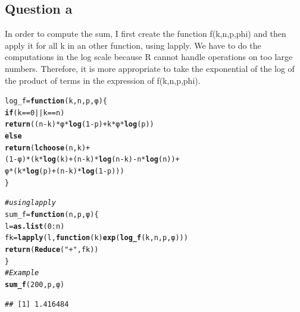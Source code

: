 \documentclass{llncs}\usepackage[]{graphicx}\usepackage[]{color}
\makeatletter
\newcommand{\hlnum}[1]{\textcolor[rgb]{0.686,0.059,0.569}{#1}}%
\newcommand{\hlstr}[1]{\textcolor[rgb]{0.192,0.494,0.8}{#1}}%
\newcommand{\hlcom}[1]{\textcolor[rgb]{0.678,0.584,0.686}{\textit{#1}}}%
\newcommand{\hlopt}[1]{\textcolor[rgb]{0,0,0}{#1}}%
\newcommand{\hlstd}[1]{\textcolor[rgb]{0.345,0.345,0.345}{#1}}%
\newcommand{\hlkwa}[1]{\textcolor[rgb]{0.161,0.373,0.58}{\textbf{#1}}}%
\newcommand{\hlkwb}[1]{\textcolor[rgb]{0.69,0.353,0.396}{#1}}%
\newcommand{\hlkwc}[1]{\textcolor[rgb]{0.333,0.667,0.333}{#1}}%
\newcommand{\hlkwd}[1]{\textcolor[rgb]{0.737,0.353,0.396}{\textbf{#1}}}%
\newenvironment{kframe}{%
 \def\at@end@of@kframe{}%
 \ifinner\ifhmode%
  \def\at@end@of@kframe{\end{minipage}}%
  \begin{minipage}{\columnwidth}%
 \fi\fi%
 \def\FrameCommand##1{\hskip\@totalleftmargin \hskip-\fboxsep
 \colorbox{shadecolor}{##1}\hskip-\fboxsep
     \hskip-\linewidth \hskip-\@totalleftmargin \hskip\columnwidth}%
 \MakeFramed {\advance\hsize-\width
   \@totalleftmargin\z@ \linewidth\hsize
   \@setminipage}}%
 {\par\unskip\endMakeFramed%
 \at@end@of@kframe}
\newenvironment{knitrout}{}{} %
\makeatother
\begin{document}
\subsection{Question a}
In order to compute the sum, I first create the function f(k,n,p,phi) and then apply it for all k in an other function, using lapply. We have to do the computations in the log scale because R cannot handle operations on too large numbers. Therefore, it is more appropriate to take the exponential of the log of the product of terms in the expression of f(k,n,p,phi).
\begin{knitrout}
\color{fgcolor}\begin{kframe}
\begin{alltt}
\hlstd{log_f} \hlkwb{=} \hlkwa{function}\hlstd{(}\hlkwc{k}\hlstd{,}\hlkwc{n}\hlstd{,}\hlkwc{p}\hlstd{,}\hlkwc{φ}\hlstd{)\{}
  \hlkwa{if} \hlstd{(k}\hlopt{==}\hlnum{0} \hlopt{||} \hlstd{k}\hlopt{==}\hlstd{n)}
    \hlkwd{return}\hlstd{((n}\hlopt{-}\hlstd{k)}\hlopt{*}\hlstd{φ}\hlopt{*}\hlkwd{log}\hlstd{(}\hlnum{1}\hlopt{-}\hlstd{p)}\hlopt{+} \hlstd{k}\hlopt{*}\hlstd{φ}\hlopt{*}\hlkwd{log}\hlstd{(p) )}
  \hlkwa{else}
    \hlkwd{return}\hlstd{(}\hlkwd{lchoose}\hlstd{(n,k)}\hlopt{+}
             \hlstd{(}\hlnum{1}\hlopt{-}\hlstd{φ)}\hlopt{*}\hlstd{(k}\hlopt{*}\hlkwd{log}\hlstd{(k)} \hlopt{+} \hlstd{(n}\hlopt{-}\hlstd{k)}\hlopt{*}\hlkwd{log}\hlstd{(n}\hlopt{-}\hlstd{k)} \hlopt{-} \hlstd{n}\hlopt{*}\hlkwd{log}\hlstd{(n))}\hlopt{+}
            \hlstd{φ}\hlopt{*}\hlstd{(k}\hlopt{*}\hlkwd{log}\hlstd{(p)} \hlopt{+} \hlstd{(n}\hlopt{-}\hlstd{k)}\hlopt{*}\hlkwd{log}\hlstd{(}\hlnum{1}\hlopt{-}\hlstd{p)))}
\hlstd{\}}

\hlcom{# using lapply}
\hlstd{sum_f} \hlkwb{=} \hlkwa{function}\hlstd{(}\hlkwc{n}\hlstd{,}\hlkwc{p}\hlstd{,}\hlkwc{φ}\hlstd{)\{}
  \hlstd{l} \hlkwb{=} \hlkwd{as.list}\hlstd{(}\hlnum{0}\hlopt{:}\hlstd{n)}
  \hlstd{fk} \hlkwb{=} \hlkwd{lapply}\hlstd{(l,}\hlkwa{function}\hlstd{(}\hlkwc{k}\hlstd{)} \hlkwd{exp}\hlstd{(}\hlkwd{log_f}\hlstd{(k,n,p,φ)))}
  \hlkwd{return}\hlstd{(}\hlkwd{Reduce}\hlstd{(}\hlstr{"+"}\hlstd{,fk))}
\hlstd{\}}
\hlcom{# Example}
\hlkwd{sum_f}\hlstd{(}\hlnum{200}\hlstd{,p,φ)}
\end{alltt}
\begin{lstlisting}[basicstyle=\ttfamily,breaklines=true]
## [1] 1.416484
\end{lstlisting}
\end{kframe}
\end{knitrout}
\end{document}
